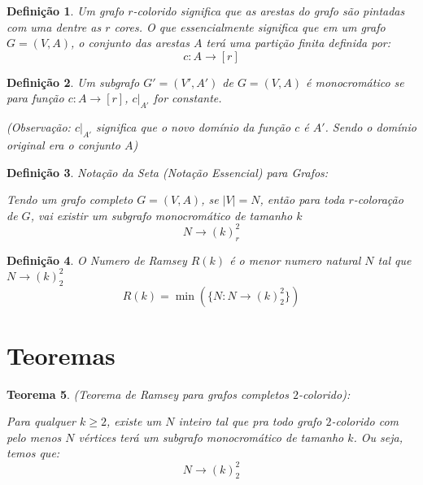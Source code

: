 \documentclass{article}
\newtheorem{teor}{Teorema}[section]
\newtheorem{defi}[teor]{Definição}
\begin{document}
\begin{defi}
    \label{coloring_r}
    Um grafo $r$\emph{-colorido} significa que as arestas do grafo são pintadas com uma dentre as $r$ cores. O que essencialmente significa que em um grafo $G = (V, A)$, o conjunto das arestas $A$ terá uma partição finita definida por:
    \[c:A\rightarrow[r]\]
\end{defi}

\begin{defi}
    \label{monochromatic_k}
    Um subgrafo $G' = (V', A')$ de $G = (V, A)$ é \emph{monocromático} se para função $c:A\rightarrow[r]$, $c|_{A'}$ for constante.

    (Observação: $c|_{A'}$ significa que o novo domínio da função $c$ é $A'$. Sendo o domínio original era o conjunto $A$)
\end{defi}

\begin{defi}
    \label{essential_notation_graph}
    \emph{Notação da Seta (Notação Essencial) para Grafos}:

    Tendo um grafo completo $G = (V, A)$, se $|V| = N$, então para toda $r$\emph{-coloração} de $G$, vai existir um subgrafo monocromático de tamanho $k$
    \[N\longrightarrow(k)_r^2\]
\end{defi}

\begin{defi}
    \label{ramsey_number}
    O \emph{Numero de Ramsey} $R(k)$ é o menor numero natural $N$ tal que $N\longrightarrow(k)_2^2$
    \[R(k) = \min(\{N: N\longrightarrow(k)_2^2\})\]
\end{defi}


\section{Teoremas}


\begin{teor}
    (Teorema de Ramsey para grafos completos $2$\emph{-colorido}):

    Para qualquer $k \ge 2$, existe um $N$ inteiro tal que pra todo grafo $2$\emph{-colorido} com pelo menos $N$ vértices terá um subgrafo monocromático de tamanho $k$. Ou seja, temos que:
    \[N\longrightarrow(k)_2^2\]
\end{teor}
\end{document}
